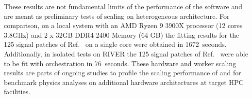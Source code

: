 

These results are not fundamental limits of the performance of the software and are meant as preliminary tests of scaling on heterogeneous architecture.
For comparison, on a local system with an AMD Ryzen 9 3900X processor (12 cores 3.8GHz) and 2 x 32GB DDR4-2400 Memory (64 GB) the fitting results for the 125 signal patches of Ref.~\cite{ATLAS_SUSY_1Lbb_pallet} on a single core were obtained in 1672~seconds.
Additionally, in isolated tests on RIVER the 125 signal patches of Ref.~\cite{ATLAS_SUSY_1Lbb_pallet} were able to be fit with \funcX{} orchestration in 76~seconds.
These hardware and worker scaling results are parts of ongoing studies to profile the scaling performance of \funcX{} and \pyhf{} for benchmark physics analyses on additional hardware architectures at target HPC facilities.
